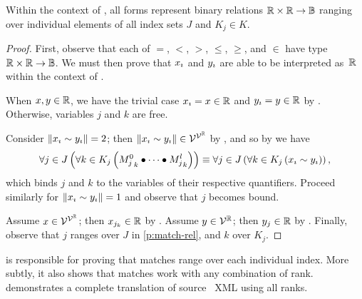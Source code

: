 \begin{theorem}
  Within the context of ,
    all  forms represent binary relations
      $\mathbb{R}\times\mathbb{R}\rightarrow\mathbb{B}$
    ranging over individual elements of all index sets $J$ and $K_j\in K$.
\end{theorem}
\begin{proof}
  First,
    observe that each of $=$, $<$, $>$, $\leq$, $\geq$, and $\in$
    have type $\mathbb{R}\times\mathbb{R}\rightarrow\mathbb{B}$.
  We must then prove that ${x}_{\imath}$ and ${y}_{\imath}$ are able to be
    interpreted as~$\mathbb{R}$ within the context of .

  When $x,y\in\mathbb{R}$,
    we have the trivial case ${x}_{\imath}=x\in\mathbb{R}$ and ${y}_{\imath}=y\in\mathbb{R}$
    by .
  Otherwise,
    variables $j$ and $k$ are free.

  Consider $\left\|{x}_{\imath} \sim {y}_{\imath}\right\| = 2$;
    then $\left\|{x}_{\imath} \sim {y}_{\imath}\right\| \in\mathcal{V}^{\mathcal{V}^{\mathbb{R}}}$ by ,
      and so by  we have
  \begin{equation}\label{p:match-rel}
    \Forall{j\in J}{\Forall{k\in K_j}{\cpredmatseq}}
      \equiv
      \Forall{j\in J}{\Forall{k\in K_j}{\varsub x \sim \varsub y}},
  \end{equation}
  which binds $j$ and $k$ to the variables of their respective quantifiers.
  Proceed similarly for $\left\|{x}_{\imath} \sim {y}_{\imath}\right\| = 1$ and observe that
    $j$ becomes bound.

  Assume $x\in\mathcal{V}^{\mathcal{V}^{\mathbb{R}}}$;
    then $x_{j_k}\in\mathbb{R}$ by .
  Assume $y\in\mathcal{V}^{\mathbb{R}}$;
    then $y_j\in\mathbb{R}$ by .
  Finally,
    observe that $j$ ranges over $J$ in \ref{p:match-rel},
      and $k$ over $K_j$.
\end{proof}

 is responsible for proving that matches range over each
  individual index.
More subtly,
  it also shows that matches work with any combination of rank.
 demonstrates a complete translation of
  source \tame{}~XML using all ranks.

